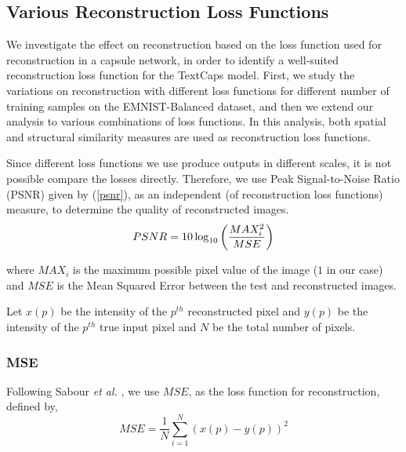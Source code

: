 \subsection{Various Reconstruction Loss Functions} \label{sec:meth_loss}
We investigate the effect on reconstruction based on the loss function used for reconstruction in a capsule network, in order to identify a well-suited reconstruction loss function for the TextCaps model.  First, we study the variations on reconstruction with different loss functions for different number of training samples on the EMNIST-Balanced dataset, and then we extend our analysis to various combinations of loss functions. In this analysis, both spatial and structural similarity measures are used as reconstruction  loss functions. 
 
Since different loss functions we use produce outputs in different scales, it is not possible compare the losses directly. Therefore, we use Peak Signal-to-Noise Ratio (PSNR) given by (\ref{psnr}), as an independent (of reconstruction loss functions) measure, to determine the quality of reconstructed images. 
\vspace{-4mm}
\begin{equation}
PSNR = 10\log_{10} \left(\frac{MAX_i^2}{MSE}\right)
\label{psnr}
\vspace{-1mm}
\end{equation}

where $MAX_i$ is the maximum possible pixel value of the image ($1$ in our case) and $MSE$ is the Mean Squared Error between the test and reconstructed images. 

Let $x(p)$ be the intensity of the $p^{th}$ reconstructed pixel and $y(p)$ be the intensity of the $p^{th}$ true input pixel and $N$ be the total number of pixels.

\vspace{-0.4cm}
\subsubsection{MSE}

Following Sabour \textit{et al.} \cite{sabour2017dynamic}, we use $MSE$, as the loss function for reconstruction, defined by,
\vspace{-0.2cm}
\begin{equation}
MSE = \frac{1}{N} \sum_{i=1}^{N} (x(p)-y(p))^2
\label{mse}
\end{equation}

\vspace{-0.9cm}
